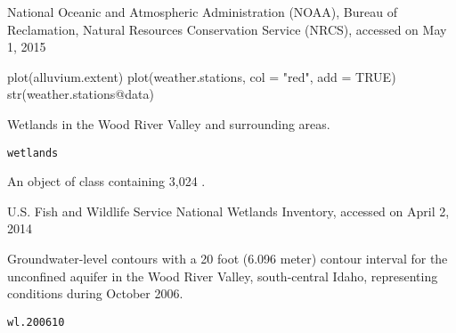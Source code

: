 \documentclass[letterpaper]{book}
\begin{document}
%
\begin{Source}\relax
National Oceanic and Atmospheric Administration (NOAA), Bureau of Reclamation, Natural Resources Conservation Service (NRCS), accessed on May 1, 2015
\end{Source}
%
\begin{Examples}
\begin{ExampleCode}
plot(alluvium.extent)
plot(weather.stations, col = "red", add = TRUE)
str(weather.stations@data)
\end{ExampleCode}
\end{Examples}
%
\begin{Description}\relax
Wetlands in the Wood River Valley and surrounding areas.
\end{Description}
%
\begin{Usage}
\begin{verbatim}
wetlands
\end{verbatim}
\end{Usage}
%
\begin{Format}
An object of  class containing 3,024 .
\end{Format}
%
\begin{Source}\relax
U.S. Fish and Wildlife Service National Wetlands Inventory, accessed on April 2, 2014
\end{Source}
%
\begin{Examples}
\end{Examples}
%
\begin{Description}\relax
Groundwater-level contours with a 20 foot (6.096 meter) contour interval for the unconfined aquifer in the Wood River Valley, south-central Idaho, representing conditions during October 2006.
\end{Description}
%
\begin{Usage}
\begin{verbatim}
wl.200610
\end{verbatim}
\end{Usage}
%
\end{document}
